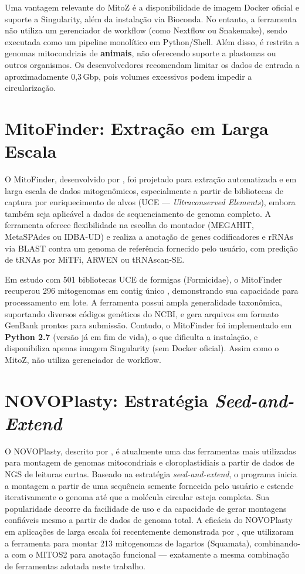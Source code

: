Uma vantagem relevante do MitoZ é a disponibilidade de imagem Docker oficial e suporte a Singularity, além da instalação via Bioconda. No entanto, a ferramenta não utiliza um gerenciador de workflow (como Nextflow ou Snakemake), sendo executada como um pipeline monolítico em Python/Shell. Além disso, é restrita a genomas mitocondriais de \textbf{animais}, não oferecendo suporte a plastomas ou outros organismos. Os desenvolvedores recomendam limitar os dados de entrada a aproximadamente 0,3\,Gbp, pois volumes excessivos podem impedir a circularização.

\section{MitoFinder: Extração em Larga Escala}

O MitoFinder, desenvolvido por , foi projetado para extração automatizada e em larga escala de dados mitogenômicos, especialmente a partir de bibliotecas de captura por enriquecimento de alvos (UCE --- \textit{Ultraconserved Elements}), embora também seja aplicável a dados de sequenciamento de genoma completo. A ferramenta oferece flexibilidade na escolha do montador (MEGAHIT, MetaSPAdes ou IDBA-UD) e realiza a anotação de genes codificadores e rRNAs via BLAST contra um genoma de referência fornecido pelo usuário, com predição de tRNAs por MiTFi, ARWEN ou tRNAscan-SE.

Em estudo com 501 bibliotecas UCE de formigas (Formicidae), o MitoFinder recuperou 296 mitogenomas em contig único \cite{allio2020}, demonstrando sua capacidade para processamento em lote. A ferramenta possui ampla generalidade taxonômica, suportando diversos códigos genéticos do NCBI, e gera arquivos em formato GenBank prontos para submissão. Contudo, o MitoFinder foi implementado em \textbf{Python 2.7} (versão já em fim de vida), o que dificulta a instalação, e disponibiliza apenas imagem Singularity (sem Docker oficial). Assim como o MitoZ, não utiliza gerenciador de workflow.

\section{NOVOPlasty: Estratégia \textit{Seed-and-Extend}}

O NOVOPlasty, descrito por , é atualmente uma das ferramentas mais utilizadas para montagem de genomas mitocondriais e cloroplastidiais a partir de dados de NGS de leituras curtas. Baseado na estratégia \textit{seed-and-extend}, o programa inicia a montagem a partir de uma sequência semente fornecida pelo usuário e estende iterativamente o genoma até que a molécula circular esteja completa. Sua popularidade decorre da facilidade de uso e da capacidade de gerar montagens confiáveis mesmo a partir de dados de genoma total. A eficácia do NOVOPlasty em aplicações de larga escala foi recentemente demonstrada por , que utilizaram a ferramenta para montar 213 mitogenomas de lagartos (Squamata), combinando-a com o MITOS2 para anotação funcional --- exatamente a mesma combinação de ferramentas adotada neste trabalho.

